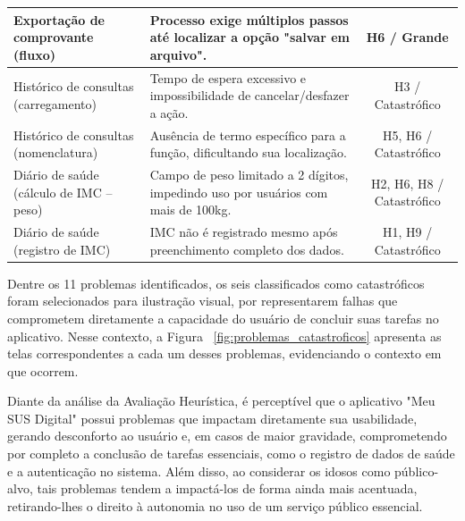 \documentclass[12pt]{article}
\begin{document}
\begin{abstractp}
\begin{table}[htbp]
\begin{tabular}{|p{3.5cm}|p{7.5cm}|c|}
Exportação de comprovante (fluxo) & 
Processo exige múltiplos passos até localizar a opção "salvar em arquivo". & 
H6 / Grande \\
\hline

Histórico de consultas (carregamento) & 
Tempo de espera excessivo e impossibilidade de cancelar/desfazer a ação. & 
H3 / Catastrófico \\
\hline

Histórico de consultas (nomenclatura) & 
Ausência de termo específico para a função, dificultando sua localização. & 
H5, H6 / Catastrófico \\
\hline

Diário de saúde (cálculo de IMC – peso) & 
Campo de peso limitado a 2 dígitos, impedindo uso por usuários com mais de 100kg. & 
H2, H6, H8 / Catastrófico \\
\hline

Diário de saúde (registro de IMC) & 
IMC não é registrado mesmo após preenchimento completo dos dados. & 
H1, H9 / Catastrófico \\
\hline

\end{tabular}
\end{table}



Dentre os 11 problemas identificados, os seis classificados como catastróficos foram selecionados para ilustração visual, por representarem falhas que comprometem diretamente a capacidade do usuário de concluir suas tarefas no aplicativo. Nesse contexto, a Figura ~\ref{fig:problemas_catastroficos} apresenta as telas 
correspondentes a cada um desses problemas, evidenciando o contexto em que ocorrem.

Diante da análise da Avaliação Heurística, é perceptível que o aplicativo "Meu SUS Digital" possui problemas que impactam diretamente sua usabilidade, gerando desconforto ao usuário e, em casos de maior gravidade, comprometendo por completo a conclusão de tarefas essenciais, como o registro de dados de saúde e a autenticação no sistema. Além disso, ao considerar os idosos como público-alvo, tais problemas tendem a impactá-los de forma ainda mais acentuada, retirando-lhes o direito à autonomia no uso de um serviço público essencial.






\end{abstractp}
\end{document}
